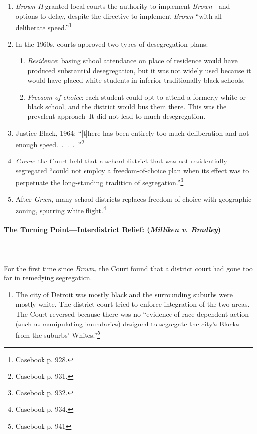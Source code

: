 \begin{enumerate}
    \item \emph{Brown II} granted local courts the authority to implement 
    \emph{Brown}---and options to delay, despite the directive to implement 
    \emph{Brown} ``with all deliberate speed.''\footnote{Casebook p. 928.}
    \item In the 1960s, courts approved two types of desegregation plans:
    \begin{enumerate}
        \item \emph{Residence}: basing school attendance on place of residence 
        would have produced substantial desegregation, but it was not widely 
        used because it would have placed white students in inferior 
        traditionally black schools.
        \item \emph{Freedom of choice}: each student could opt to attend a 
        formerly white or black school, and the district would bus them there. 
        This was the prevalent approach. It did not lead to much 
        desegregation.
    \end{enumerate}
    \item Justice Black, 1964: ``[t]here has been entirely too much 
    deliberation and not enough speed.~.~.~.~''\footnote{Casebook p. 931.}
    \item \emph{Green}: the Court held that a school district that was not 
    residentially segregated ``could not employ a freedom-of-choice plan when 
    its effect was to perpetuate the long-standing tradition of 
    segregation.''\footnote{Casebook p. 932.}
    \item After \emph{Green}, many school districts replaces freedom of choice 
    with geographic zoning, spurring white flight.\footnote{Casebook p. 934.}
\end{enumerate}

\paragraph{The Turning Point---Interdistrict Relief: (\emph{Milliken v.  
Bradley})}
~\\\\
For the first time since \emph{Brown}, the Court found that a district court
had gone too far in remedying segregation.

\begin{enumerate}
    \item The city of Detroit was mostly black and the surrounding suburbs 
    were mostly white. The district court tried to enforce integration of the 
    two areas. The Court reversed because there was no ``evidence of 
    race-dependent action (such as manipulating 
    boundaries) designed to segregate the city's Blacks from the suburbs' 
    Whites.''\footnote{Casebook p. 941}
\end{enumerate}

